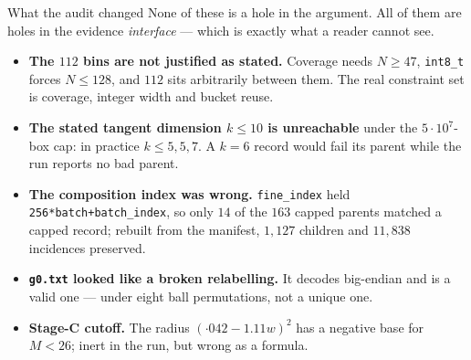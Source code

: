\documentclass[aspectratio=169,10pt]{beamer}
\begin{document}
\begin{frame}{What the audit changed}
  \small
  None of these is a hole in the argument. All of them are holes in the evidence
  \emph{interface} --- which is exactly what a reader cannot see.
  \medskip

  \begin{itemize}\setlength{\itemsep}{2.2mm}
    \item \textbf{The $112$ bins are not justified as stated.} Coverage needs $N\ge47$,
          \texttt{int8\_t} forces $N\le128$, and $112$ sits arbitrarily between them. The real
          constraint set is coverage, integer width and bucket reuse.
    \item \textbf{The stated tangent dimension $k\le10$ is unreachable} under the
          $5\cdot10^7$-box cap: in practice $k\le5,5,7$. A $k=6$ record would fail its parent while
          the run reports no bad parent.
    \item \textbf{The composition index was wrong.} \texttt{fine\_index} held
          \texttt{256*batch+batch\_index}, so only $14$ of the $163$ capped parents matched a capped
          record; rebuilt from the manifest, $1{,}127$ children and $11{,}838$ incidences preserved.
    \item \textbf{\texttt{g0.txt} looked like a broken relabelling.} It decodes big-endian and is a
          valid one --- under eight ball permutations, not a unique one.
    \item \textbf{Stage-C cutoff.} The radius $(\cdot042-1.11w)^2$ has a negative base for $M<26$;
          inert in the run, but wrong as a formula.
  \end{itemize}
\end{frame}
\end{document}
